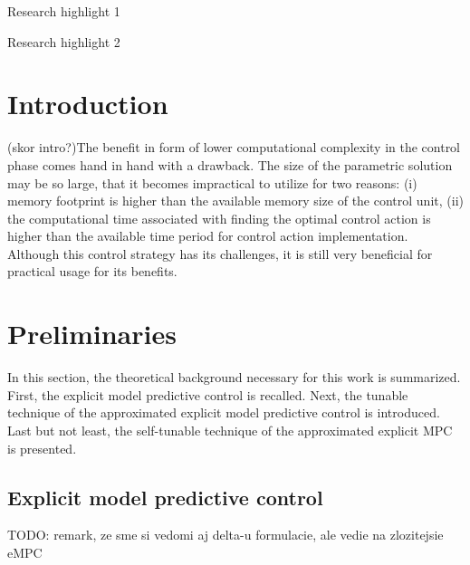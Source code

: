 \documentclass[preprint,12pt]{elsarticle}
\begin{document}
\begin{frontmatter}
\begin{highlights}
\item Research highlight 1
\item Research highlight 2
\end{highlights}

\begin{keyword}



\end{keyword}

\end{frontmatter}


\section{Introduction}
\label{sec:introduction}
 
(skor intro?)The benefit in form of lower computational complexity in the control phase comes hand in hand with a drawback. The size of the parametric solution may be so large, that it becomes impractical to utilize for two reasons: (i) memory footprint is higher than the available memory size of the control unit, (ii) the computational time associated with finding the optimal control action is higher than the available time period for control action implementation. Although this control strategy has its challenges, it is still very beneficial for practical usage for its benefits. 

\section{Preliminaries}
\label{sec:preliminaries}
In this section, the theoretical background necessary for this work is summarized. First, the explicit model predictive control is recalled. Next, the tunable technique of the approximated explicit model predictive control is introduced. Last but not least, the self-tunable technique of the approximated explicit MPC is presented.

\subsection{Explicit model predictive control}
\label{sec:eMPC}
TODO: remark, ze sme si vedomi aj delta-u formulacie, ale vedie na zlozitejsie eMPC
\end{document}
